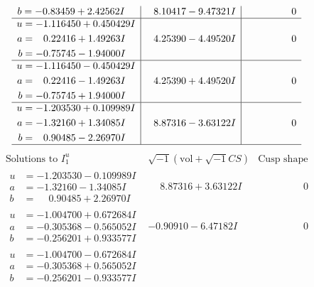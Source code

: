 \documentclass[1p]{elsarticle_modified}
\theoremstyle{definition}
\newcommand{\I}{\sqrt{-1}}
\begin{document}
$$\begin{array}{c|c|c}
\begin{aligned}
b &= -0.83459 + 2.42562 I\end{aligned}
 & \phantom{-}8.10417 - 9.47321 I & \phantom{-0.000000 } 0 \\ \hline\begin{aligned}
u &= -1.116450 + 0.450429 I \\
a &= \phantom{-}0.22416 + 1.49263 I \\
b &= -0.75745 - 1.94000 I\end{aligned}
 & \phantom{-}4.25390 - 4.49520 I & \phantom{-0.000000 } 0 \\ \hline\begin{aligned}
u &= -1.116450 - 0.450429 I \\
a &= \phantom{-}0.22416 - 1.49263 I \\
b &= -0.75745 + 1.94000 I\end{aligned}
 & \phantom{-}4.25390 + 4.49520 I & \phantom{-0.000000 } 0 \\ \hline\begin{aligned}
u &= -1.203530 + 0.109989 I \\
a &= -1.32160 + 1.34085 I \\
b &= \phantom{-}0.90485 - 2.26970 I\end{aligned}
 & \phantom{-}8.87316 - 3.63122 I & \phantom{-0.000000 } 0\\
 \hline 
 \end{array}$$\newpage$$\begin{array}{c|c|c}  
\text{Solutions to }I^u_{1}& \I (\text{vol} + \sqrt{-1}CS) & \text{Cusp shape}\\
 \hline 
\begin{aligned}
u &= -1.203530 - 0.109989 I \\
a &= -1.32160 - 1.34085 I \\
b &= \phantom{-}0.90485 + 2.26970 I\end{aligned}
 & \phantom{-}8.87316 + 3.63122 I & \phantom{-0.000000 } 0 \\ \hline\begin{aligned}
u &= -1.004700 + 0.672684 I \\
a &= -0.305368 - 0.565052 I \\
b &= -0.256201 + 0.933577 I\end{aligned}
 & -0.90910 - 6.47182 I & \phantom{-0.000000 } 0 \\ \hline\begin{aligned}
u &= -1.004700 - 0.672684 I \\
a &= -0.305368 + 0.565052 I \\
b &= -0.256201 - 0.933577 I\end{aligned}

\end{array}$$
\end{document}
